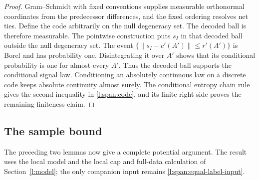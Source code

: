 \begin{proof}
Gram--Schmidt with fixed conventions supplies measurable
orthonormal coordinates from the predecessor differences, and the
fixed ordering resolves net ties.  Define the code arbitrarily on
the null degeneracy set.  The decoded ball is therefore measurable.
The pointwise construction puts \(s_I\) in that decoded ball outside
the null degeneracy set.  The event
\(\{\|s_I-c'(A')\|\le r'(A')\}\) is Borel and has probability one.
Disintegrating it over \(A'\) shows that its conditional probability
is one for almost every \(A'\).  Thus the decoded ball supports the
conditional signal law.
Conditioning an absolutely continuous law on a discrete code keeps
absolute continuity almost surely.  The conditional entropy chain
rule gives the second inequality in \eqref{l:span:code}, and its
finite right side proves the remaining finiteness claim.
\end{proof}

\subsection{The sample bound}

The preceding two lemmas now give a complete potential argument.
The result uses the local model and the local cap and full-data
calculation of Section~\ref{l:model}; the only companion input remains
\eqref{l:span:equal-label-input}.

